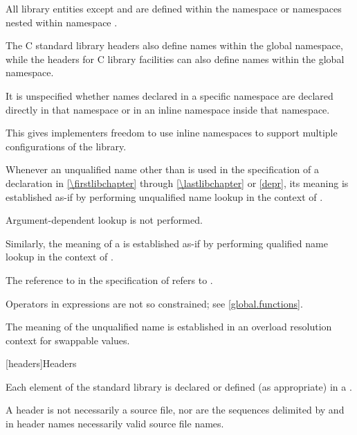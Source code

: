\pnum
All library entities except
and
are defined within the namespace
or namespaces nested within namespace
.
\begin{footnote}
The C standard library headers also define
names within the global namespace, while the \Cpp{} headers for C library
facilities can also define names within the global namespace.
\end{footnote}
It is unspecified whether names declared in a specific namespace are declared
directly in that namespace or in an inline namespace inside that
namespace.
\begin{footnote}
This gives implementers freedom to use inline namespaces to
support multiple configurations of the library.
\end{footnote}

\pnum
Whenever an unqualified name other than  is used
in the specification of a declaration 
in \ref{\firstlibchapter} through \ref{\lastlibchapter} or \ref{depr},
its meaning is established
as-if by performing unqualified name lookup
in the context of .
\begin{note}
Argument-dependent lookup is not performed.
\end{note}
Similarly, the meaning of a  is established
as-if by performing qualified name lookup
in the context of .
\begin{example}
The reference to  in the specification of  refers to .
\end{example}
\begin{note}
Operators in expressions are not so constrained;
see \ref{global.functions}.
\end{note}
The meaning of the unqualified name  is established
in an overload resolution context
for swappable values.

[headers]{Headers}

\pnum
Each element of the \Cpp{} standard library is declared or defined (as appropriate) in a
.
\begin{footnote}
A header is not necessarily a source file, nor are the
sequences delimited by \tcode{<} and \tcode{>} in header names necessarily valid source
file names.
\end{footnote}

